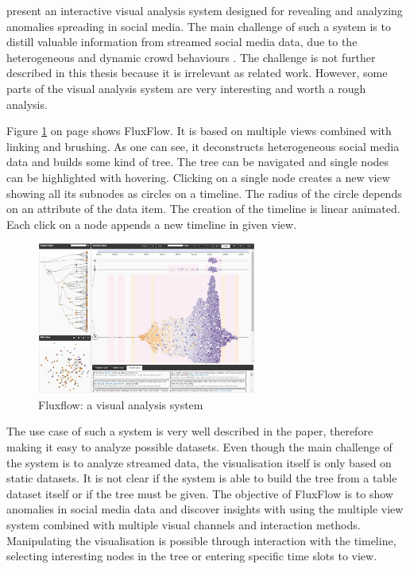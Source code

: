 \citeauthor{Zhao2014} present an interactive visual analysis system designed for revealing and analyzing anomalies spreading in social media. The main challenge of such a system is to distill valuable information from streamed social media data, due to the heterogeneous and dynamic crowd behaviours . The challenge is not further described in this thesis because it is irrelevant as related work. However, some parts of the visual analysis system are very interesting and worth a rough analysis.

Figure \ref{fig:fluxflow} on page \pageref{fig:fluxflow} shows FluxFlow. It is based on multiple views combined with linking and brushing. As one can see, it deconstructs heterogeneous social media data and builds some kind of tree. The tree can be navigated and single nodes can be highlighted with hovering. Clicking on a single node creates a new view showing all its subnodes as circles on a timeline. The radius of the circle depends on an attribute of the data item. The creation of the timeline is linear animated. Each click on a node appends a new timeline in given view.

\begin{figure}[!htb]
\centering
\includegraphics[height=5cm]{images/methods/related/fluxflow.png}
\caption[
    Fluxflow: a visual analysis system .
]{Fluxflow: a visual analysis system}
\label{fig:fluxflow}
\end{figure}

The use case of such a system is very well described in the paper, therefore making it easy to analyze possible datasets. Even though the main challenge of the system is to analyze streamed data, the visualisation itself is only based on static datasets. It is not clear if the system is able to build the tree from a table dataset itself or if the tree must be given.
The objective of FluxFlow is to show anomalies in social media data and discover insights with using the multiple view system combined with multiple visual channels and interaction methods. Manipulating the visualisation is possible through interaction with the timeline, selecting interesting nodes in the tree or entering specific time slots to view.